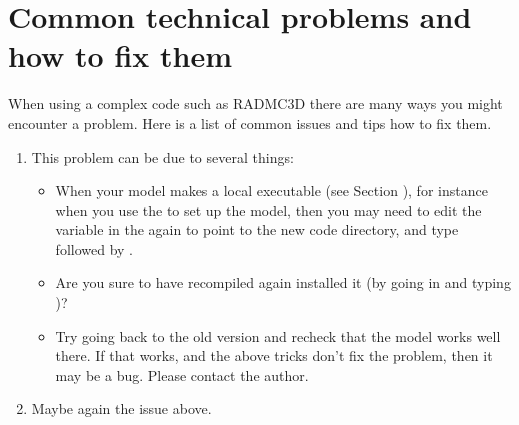 \documentclass[letterpaper,10pt,english]{sphinxmanual}
\begin{document}
\section{Common technical problems and how to fix them}
\label{\detokenize{tipsandtricks:common-technical-problems-and-how-to-fix-them}}
When using a complex code such as RADMC\sphinxhyphen{}3D there are many ways you might
encounter a problem. Here is a list of common issues and tips how to fix them.
\begin{enumerate}
%
\item {} 

This problem can be due to several things:
\begin{itemize}
\item {} 
When your model makes a local  executable (see Section
{\hyperref[\detokenize{installation:sec-special-purpose-compile}]{}}), for instance when you use the
 to set up the model, then you may need to edit the
 variable in the  again to point to the new code
directory, and type  followed by .

\item {} 
Are you sure to have recompiled  again  installed it (by
going in  and typing )?

\item {} 
Try going back to the old version and recheck that the model works well
there. If that works, and the above tricks don’t fix the problem, then it
may be a bug. Please contact the author.

\end{itemize}

\item {} 

Maybe again the  issue above.


\end{enumerate}
\end{document}
